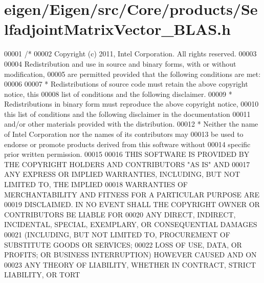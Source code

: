 \hypertarget{eigen_2_eigen_2src_2_core_2products_2_selfadjoint_matrix_vector___b_l_a_s_8h_source}{}\section{eigen/\+Eigen/src/\+Core/products/\+Selfadjoint\+Matrix\+Vector\+\_\+\+B\+L\+AS.h}
\label{eigen_2_eigen_2src_2_core_2products_2_selfadjoint_matrix_vector___b_l_a_s_8h_source}

\begin{DoxyCode}
00001 \textcolor{comment}{/*}
00002 \textcolor{comment}{ Copyright (c) 2011, Intel Corporation. All rights reserved.}
00003 \textcolor{comment}{}
00004 \textcolor{comment}{ Redistribution and use in source and binary forms, with or without modification,}
00005 \textcolor{comment}{ are permitted provided that the following conditions are met:}
00006 \textcolor{comment}{}
00007 \textcolor{comment}{ * Redistributions of source code must retain the above copyright notice, this}
00008 \textcolor{comment}{   list of conditions and the following disclaimer.}
00009 \textcolor{comment}{ * Redistributions in binary form must reproduce the above copyright notice,}
00010 \textcolor{comment}{   this list of conditions and the following disclaimer in the documentation}
00011 \textcolor{comment}{   and/or other materials provided with the distribution.}
00012 \textcolor{comment}{ * Neither the name of Intel Corporation nor the names of its contributors may}
00013 \textcolor{comment}{   be used to endorse or promote products derived from this software without}
00014 \textcolor{comment}{   specific prior written permission.}
00015 \textcolor{comment}{}
00016 \textcolor{comment}{ THIS SOFTWARE IS PROVIDED BY THE COPYRIGHT HOLDERS AND CONTRIBUTORS "AS IS" AND}
00017 \textcolor{comment}{ ANY EXPRESS OR IMPLIED WARRANTIES, INCLUDING, BUT NOT LIMITED TO, THE IMPLIED}
00018 \textcolor{comment}{ WARRANTIES OF MERCHANTABILITY AND FITNESS FOR A PARTICULAR PURPOSE ARE}
00019 \textcolor{comment}{ DISCLAIMED. IN NO EVENT SHALL THE COPYRIGHT OWNER OR CONTRIBUTORS BE LIABLE FOR}
00020 \textcolor{comment}{ ANY DIRECT, INDIRECT, INCIDENTAL, SPECIAL, EXEMPLARY, OR CONSEQUENTIAL DAMAGES}
00021 \textcolor{comment}{ (INCLUDING, BUT NOT LIMITED TO, PROCUREMENT OF SUBSTITUTE GOODS OR SERVICES;}
00022 \textcolor{comment}{ LOSS OF USE, DATA, OR PROFITS; OR BUSINESS INTERRUPTION) HOWEVER CAUSED AND ON}
00023 \textcolor{comment}{ ANY THEORY OF LIABILITY, WHETHER IN CONTRACT, STRICT LIABILITY, OR TORT}

\end{DoxyCode}
